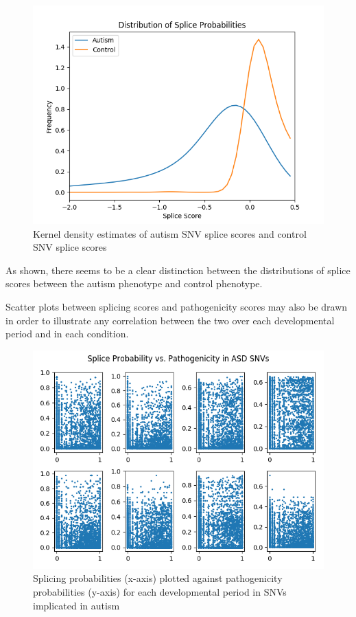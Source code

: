 \documentclass[12pt]{article}
\begin{document}
\begin{figure}[ht]
\centering
    \includegraphics[width=\textwidth,height=\textheight,keepaspectratio]{../analysis/splice_distributions.png}
    \caption{Kernel density estimates of autism SNV splice scores and control SNV splice scores}
\end{figure}

As shown, there seems to be a clear distinction between the distributions of 
splice scores between the autism phenotype and control phenotype.

\pagebreak

Scatter plots between splicing scores and pathogenicity scores
may also be drawn in order to illustrate any correlation between the two over
each developmental period and in each condition.

\begin{figure}[ht]
\centering
    \includegraphics[width=\textwidth,height=\textheight,keepaspectratio]{../analysis/pos_corr.png}
    \caption{Splicing probabilities (x-axis) plotted against pathogenicity probabilities (y-axis) for each developmental period in SNVs implicated in autism}
\end{figure}
\end{document}
